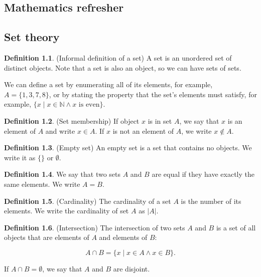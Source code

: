 \documentclass{book}
\theoremstyle{plain}%
\theoremstyle{definition}
\newtheorem{definition}{Definition}[section]
\begin{document}
\begin{appendices}

\chapter{Mathematics refresher}

\section{Set theory}

\begin{definition}(Informal definition of a set) A set is an unordered set of distinct objects. Note that a set is also an object, so we can have sets of sets.
\end{definition}

We can define a set by enumerating all of its elements, for example, $A = \{1,3,7,8\}$, or by stating the property that the set's elements must satisfy, for example, $\{x \mid x \in \mathbb{N} \wedge \text{$x$ is even}\}$.

\begin{definition}(Set membership) If object $x$ is in set $A$, we say that $x$ is an element of $A$ and write $x \in A$. If $x$ is not an element of $A$, we write $x \notin A$.
\end{definition}

\begin{definition}(Empty set) An empty set is a set that contains no objects. We write it as $\{\}$ or $\emptyset$.
\end{definition}

\begin{definition} We say that two sets $A$ and $B$ are equal if they have exactly the same elements. We write $A = B$.
\end{definition}

\begin{definition}(Cardinality) The cardinality of a set $A$ is the number of its elements. We write the cardinality of set $A$ as $|A|$.
\end{definition}

\begin{definition}(Intersection) The intersection of two sets $A$ and $B$ is a set of all objects that are elements of $A$ and elements of $B$:

$$A \cap B = \{x \mid x \in A \wedge x \in B\}.$$

If $A \cap B = \emptyset$, we say that $A$ and $B$ are disjoint.
\end{definition}


\end{appendices}
\end{document}
